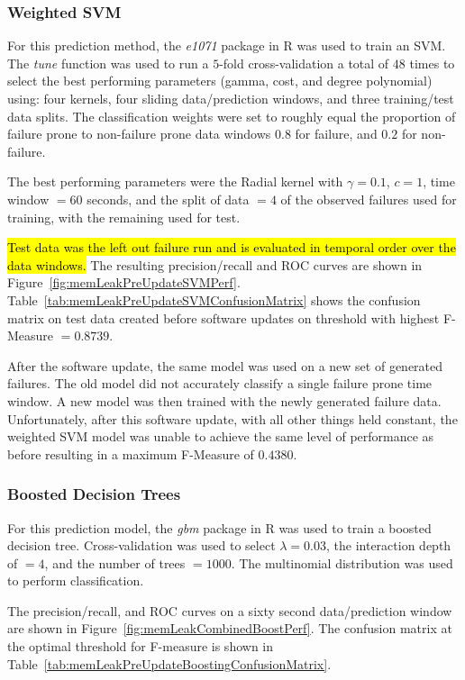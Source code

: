 \subsubsection{Weighted \ac{SVM}}
For this prediction method, the \emph{e1071} package in R was used to train an
\ac{SVM}.  The \emph{tune} function was used to run a $5$-fold cross-validation
a total of $48$ times to select the best performing parameters (gamma, cost,
and degree polynomial) using: four kernels, four sliding data/prediction
windows, and three training/test data splits.  The classification weights were
set to roughly equal the proportion of failure prone to non-failure prone data
windows $0.8$ for failure, and $0.2$ for non-failure.

The best performing parameters were the Radial kernel with $\gamma = 0.1$, $c =
1$, time window $= 60$ seconds, and the split of data $= 4$ of the observed
failures used for training, with the remaining used for test.

\hl{Test data was the left out failure run and is evaluated in temporal order
over the data windows.}  The resulting precision/recall and \ac{ROC} curves are
shown in Figure~\ref{fig:memLeakPreUpdateSVMPerf}.
Table~\ref{tab:memLeakPreUpdateSVMConfusionMatrix} shows the confusion matrix
on test data created before software updates on threshold with highest
F-Measure $= 0.8739$. 

\figMemLeakPreUpdateSVMPerf
\tabMemLeakPreUpdateSVMConfusionMatrix

After the software update, the same model was used on a new set of generated
failures.  The old model did not accurately classify a single failure prone
time window.  A new model was then trained with the newly generated failure
data.  Unfortunately, after this software update, with all other things held
constant, the weighted SVM model was unable to achieve the same level of
performance as before resulting in a maximum F-Measure of $0.4380$.

\subsubsection{Boosted Decision Trees}
For this prediction model, the \emph{gbm} package in R was used to train a
boosted decision tree.  Cross-validation was used to select $\lambda = 0.03$,
the interaction depth of $= 4$, and the number of trees $= 1000$.  The
multinomial distribution was used to perform classification.

The precision/recall, and \ac{ROC} curves on a sixty second data/prediction
window are shown in Figure~\ref{fig:memLeakCombinedBoostPerf}.  The
confusion matrix at the optimal threshold for F-measure is shown in
Table~\ref{tab:memLeakPreUpdateBoostingConfusionMatrix}.

